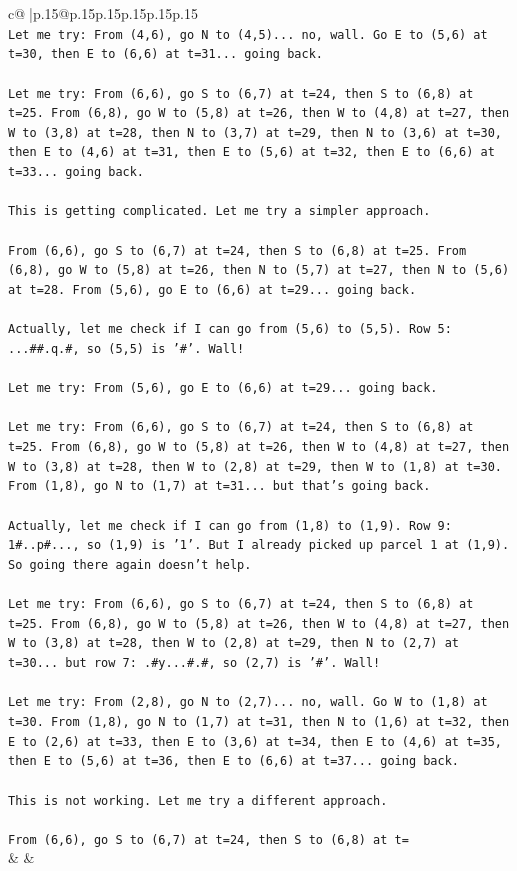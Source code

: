 \documentclass{article}
\begin{document}
{\begin{supertabular}{c@{$\;$}|p{.15\linewidth}@{}p{.15\linewidth}p{.15\linewidth}p{.15\linewidth}p{.15\linewidth}p{.15\linewidth}}
{{{\\ 
\texttt{Let me try: From (4,6), go N to (4,5)... no, wall. Go E to (5,6) at t=30, then E to (6,6) at t=31... going back.} \\
\\ 
\texttt{Let me try: From (6,6), go S to (6,7) at t=24, then S to (6,8) at t=25. From (6,8), go W to (5,8) at t=26, then W to (4,8) at t=27, then W to (3,8) at t=28, then N to (3,7) at t=29, then N to (3,6) at t=30, then E to (4,6) at t=31, then E to (5,6) at t=32, then E to (6,6) at t=33... going back.} \\
\\ 
\texttt{This is getting complicated. Let me try a simpler approach.} \\
\\ 
\texttt{From (6,6), go S to (6,7) at t=24, then S to (6,8) at t=25. From (6,8), go W to (5,8) at t=26, then N to (5,7) at t=27, then N to (5,6) at t=28. From (5,6), go E to (6,6) at t=29... going back.} \\
\\ 
\texttt{Actually, let me check if I can go from (5,6) to (5,5). Row 5: ...\#\#.q.\#, so (5,5) is '\#'. Wall!} \\
\\ 
\texttt{Let me try: From (5,6), go E to (6,6) at t=29... going back.} \\
\\ 
\texttt{Let me try: From (6,6), go S to (6,7) at t=24, then S to (6,8) at t=25. From (6,8), go W to (5,8) at t=26, then W to (4,8) at t=27, then W to (3,8) at t=28, then W to (2,8) at t=29, then W to (1,8) at t=30. From (1,8), go N to (1,7) at t=31... but that's going back.} \\
\\ 
\texttt{Actually, let me check if I can go from (1,8) to (1,9). Row 9: 1\#..p\#..., so (1,9) is '1'. But I already picked up parcel 1 at (1,9). So going there again doesn't help.} \\
\\ 
\texttt{Let me try: From (6,6), go S to (6,7) at t=24, then S to (6,8) at t=25. From (6,8), go W to (5,8) at t=26, then W to (4,8) at t=27, then W to (3,8) at t=28, then W to (2,8) at t=29, then N to (2,7) at t=30... but row 7: .\#y...\#.\#, so (2,7) is '\#'. Wall!} \\
\\ 
\texttt{Let me try: From (2,8), go N to (2,7)... no, wall. Go W to (1,8) at t=30. From (1,8), go N to (1,7) at t=31, then N to (1,6) at t=32, then E to (2,6) at t=33, then E to (3,6) at t=34, then E to (4,6) at t=35, then E to (5,6) at t=36, then E to (6,6) at t=37... going back.} \\
\\ 
\texttt{This is not working. Let me try a different approach.} \\
\\ 
\texttt{From (6,6), go S to (6,7) at t=24, then S to (6,8) at t=} \\
            }
        }
    }
    & & \\ \\


\end{supertabular}}
\end{document}
